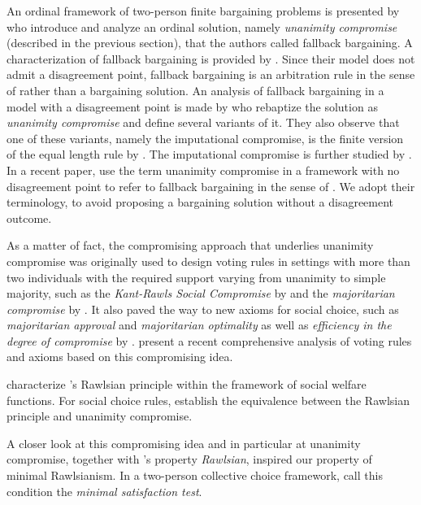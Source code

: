 \documentclass[pagesize, twoside=off, bibliography=totoc, DIV=calc, fontsize=12pt, a4paper]{scrartcl}
\begin{document}
An ordinal framework of two-person finite bargaining problems is presented by \citet{BramsKilgour2001} who introduce and analyze an ordinal solution, namely \textit{unanimity compromise} (described in the previous section), that the authors called fallback bargaining. A characterization of fallback bargaining is provided by \citet{de2012reason}. Since their model does not admit a disagreement point, fallback bargaining is an arbitration rule in the sense of \citet{Sprumont1993} rather than a bargaining solution. An analysis of fallback bargaining in a model with a disagreement point is made by \citet{KibrisSertel2007} who rebaptize the solution as \textit{unanimity compromise} and define several variants of it.
They also observe that one of these variants, namely the imputational compromise, is the finite version of the equal length rule by \citet{thomson2019equal}. The imputational compromise is further studied by \citet{ConleyWilkie2012}. In a recent paper, \citet{barbera2022compromising} use the term unanimity compromise in a framework with no disagreement point to refer to fallback bargaining in the sense of \citet{BramsKilgour2001}. We adopt their terminology, to avoid proposing a bargaining solution without a disagreement outcome.

As a matter of fact, the compromising approach that underlies unanimity compromise was originally used to design voting rules in settings with more than two individuals with the required support varying from unanimity to simple majority, such as the \textit{Kant-Rawls Social Compromise} by \citet{HurwiczSertel1997} and the \textit{majoritarian compromise} by \citet{sertel1999majoritarian}. It also paved the way to new axioms for social choice, such as \textit{majoritarian approval} and \textit{majoritarian optimality} as well as \textit{efficiency in the degree of compromise} by \citet{ozkal2004efficiency}.
\citet{merlin2019compromise} present a recent comprehensive analysis of voting rules and axioms based on this compromising idea.

 characterize \citet{Sprumont1993}’s Rawlsian principle within the framework of social welfare functions. For social choice rules, \citet{BramsKilgour2001} establish the equivalence between the Rawlsian principle and unanimity compromise. 

A closer look at this compromising idea and in particular at unanimity compromise, together with \citet{Sprumont1993}’s property \textit{Rawlsian}, inspired our property of minimal Rawlsianism. 
In a two-person collective choice framework, \citet{Clippel} call this condition the \textit{minimal satisfaction test}.
\end{document}

